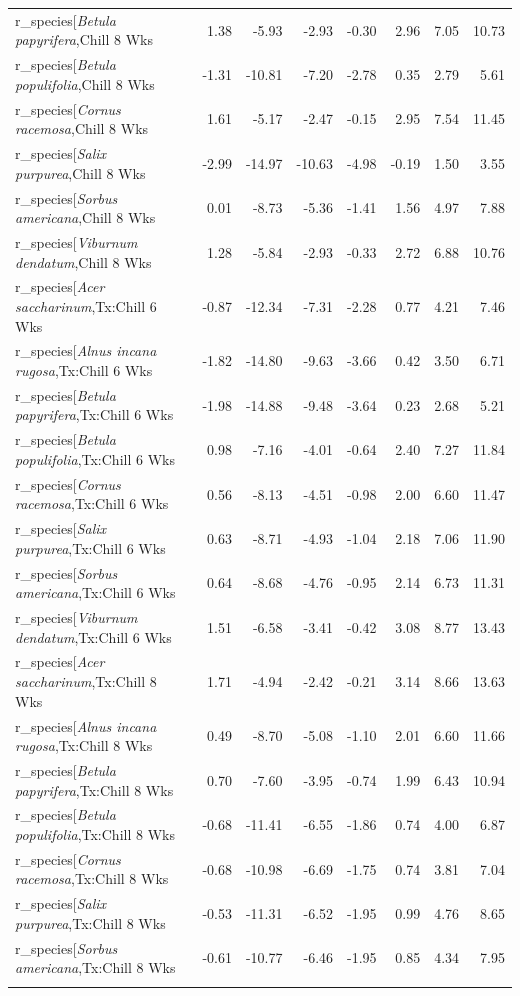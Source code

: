 \documentclass{article}\usepackage[]{graphicx}\usepackage[]{color}
\begin{document}
\begin{longtable}{lrrrrrrr}
  r_species[\textit{Betula papyrifera},Chill 8 Wks & 1.38 & -5.93 & -2.93 & -0.30 & 2.96 & 7.05 & 10.73 \\ 
  r_species[\textit{Betula populifolia},Chill 8 Wks & -1.31 & -10.81 & -7.20 & -2.78 & 0.35 & 2.79 & 5.61 \\ 
  r_species[\textit{Cornus racemosa},Chill 8 Wks & 1.61 & -5.17 & -2.47 & -0.15 & 2.95 & 7.54 & 11.45 \\ 
  r_species[\textit{Salix purpurea},Chill 8 Wks & -2.99 & -14.97 & -10.63 & -4.98 & -0.19 & 1.50 & 3.55 \\ 
  r_species[\textit{Sorbus americana},Chill 8 Wks & 0.01 & -8.73 & -5.36 & -1.41 & 1.56 & 4.97 & 7.88 \\ 
  r_species[\textit{Viburnum dendatum},Chill 8 Wks & 1.28 & -5.84 & -2.93 & -0.33 & 2.72 & 6.88 & 10.76 \\ 
  r_species[\textit{Acer saccharinum},Tx:Chill 6 Wks & -0.87 & -12.34 & -7.31 & -2.28 & 0.77 & 4.21 & 7.46 \\ 
  r_species[\textit{Alnus incana rugosa},Tx:Chill 6 Wks & -1.82 & -14.80 & -9.63 & -3.66 & 0.42 & 3.50 & 6.71 \\ 
  r_species[\textit{Betula papyrifera},Tx:Chill 6 Wks & -1.98 & -14.88 & -9.48 & -3.64 & 0.23 & 2.68 & 5.21 \\ 
  r_species[\textit{Betula populifolia},Tx:Chill 6 Wks & 0.98 & -7.16 & -4.01 & -0.64 & 2.40 & 7.27 & 11.84 \\ 
  r_species[\textit{Cornus racemosa},Tx:Chill 6 Wks & 0.56 & -8.13 & -4.51 & -0.98 & 2.00 & 6.60 & 11.47 \\ 
  r_species[\textit{Salix purpurea},Tx:Chill 6 Wks & 0.63 & -8.71 & -4.93 & -1.04 & 2.18 & 7.06 & 11.90 \\ 
  r_species[\textit{Sorbus americana},Tx:Chill 6 Wks & 0.64 & -8.68 & -4.76 & -0.95 & 2.14 & 6.73 & 11.31 \\ 
  r_species[\textit{Viburnum dendatum},Tx:Chill 6 Wks & 1.51 & -6.58 & -3.41 & -0.42 & 3.08 & 8.77 & 13.43 \\ 
  r_species[\textit{Acer saccharinum},Tx:Chill 8 Wks & 1.71 & -4.94 & -2.42 & -0.21 & 3.14 & 8.66 & 13.63 \\ 
  r_species[\textit{Alnus incana rugosa},Tx:Chill 8 Wks & 0.49 & -8.70 & -5.08 & -1.10 & 2.01 & 6.60 & 11.66 \\ 
  r_species[\textit{Betula papyrifera},Tx:Chill 8 Wks & 0.70 & -7.60 & -3.95 & -0.74 & 1.99 & 6.43 & 10.94 \\ 
  r_species[\textit{Betula populifolia},Tx:Chill 8 Wks & -0.68 & -11.41 & -6.55 & -1.86 & 0.74 & 4.00 & 6.87 \\ 
  r_species[\textit{Cornus racemosa},Tx:Chill 8 Wks & -0.68 & -10.98 & -6.69 & -1.75 & 0.74 & 3.81 & 7.04 \\ 
  r_species[\textit{Salix purpurea},Tx:Chill 8 Wks & -0.53 & -11.31 & -6.52 & -1.95 & 0.99 & 4.76 & 8.65 \\ 
  r_species[\textit{Sorbus americana},Tx:Chill 8 Wks & -0.61 & -10.77 & -6.46 & -1.95 & 0.85 & 4.34 & 7.95 \\ 
   \hline
\hline
\label{tab:suppmodrtos}
\end{longtable}
\end{document}

